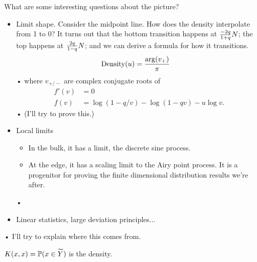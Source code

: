 What are some interesting questions about the picture?
\begin{itemize}
\item
Limit shape.
Consider the midpoint line. How does the density interpolate from 1 to 0?
It turns out that the bottom transition happens at $\frac{-2q}{1+q}N$; the top happens at $\frac{2q}{1-q}N$; and we can derive a formula for how it transitions.
\begin{align*}
\text{Density}(u) &= \frac{\arg(v_+)}{\pi}
\end{align*}•
where $v_{+/-}$ are complex conjugate roots of 
\begin{align*}
f'(v)&=0\\
f(v) &= \log (1-q/v) - \log(1-qv)-u\log v.
\end{align*}•
(I'll try to prove this.)
\item
Local limits %
\begin{itemize}
\item
In the bulk, it has a limit, the discrete sine process.
\item
At the edge, it has a scaling limit to the Airy point process.
It is a progenitor for proving the finite dimensional distribution results we're after.
\end{itemize}•
\item
Linear statistics, large deviation principles...
\end{itemize}•
I'll try to explain where this comes from.

$K(x,x) = \mathbb{P}(x\in \widetilde{Y})$ is the density.

